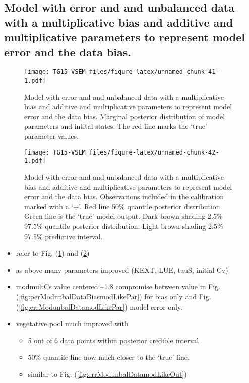 \documentclass[]{article}
\providecommand{\tightlist}{%
  \setlength{\itemsep}{0pt}\setlength{\parskip}{0pt}}
\begin{document}
\subsection{Model with error and and unbalanced data with a
multiplicative bias and additive and multiplicative parameters to
represent model error and the data
bias.}\label{model-with-error-and-and-unbalanced-data-with-a-multiplicative-bias-and-additive-and-multiplicative-parameters-to-represent-model-error-and-the-data-bias.}

\begin{figure}
\centering
\texttt{[image: TG15-VSEM\_files/figure-latex/unnamed-chunk-41-1.pdf]}
\caption{\label{fig:errModunbalDataBiasmodLikePar}Model with error and
and unbalanced data with a multiplicative bias and additive and
multiplicative parameters to represent model error and the data bias.
Marginal posterior distribution of model parameters and intital states.
The red line marks the `true' parameter values.}
\end{figure}

\begin{figure}
\centering
\texttt{[image: TG15-VSEM\_files/figure-latex/unnamed-chunk-42-1.pdf]}
\caption{\label{fig:errModunbalDataBiasmodLikeOut}Model with error and
and unbalanced data with a multiplicative bias and additive and
multiplicative parameters to represent model error and the data bias.
Observations included in the calibration marked with a `+'. Red line
50\% quantile posterior distribution. Green line is the `true' model
output. Dark brown shading 2.5\% 97.5\% quantile posterior distribution.
Light brown shading 2.5\% 97.5\% predictive interval.}
\end{figure}

\begin{itemize}
\tightlist
\item
  refer to Fig. (\ref{fig:errModunbalDataBiasmodLikePar}) and
  (\ref{fig:errModunbalDataBiasmodLikeOut})
\item
  as above many parameters improved (KEXT, LUE, tauS, initial Cv)
\item
  modmultCs value centered \textasciitilde{}1.8 compromise between value
  in Fig. (\ref{fig:perModunbalDataBiasmodLikePar}) for bias only and
  Fig. (\ref{fig:errModunbalDatamodLikePar}) model error only.
\item
  vegetative pool much improved with

  \begin{itemize}
  \tightlist
  \item
    5 out of 6 data points within posterior credible interval
  \item
    50\% quantile line now much closer to the `true' line.
  \item
    similar to Fig. (\ref{fig:errModunbalDatamodLikeOut})
  \end{itemize}
\end{itemize}
\end{document}
